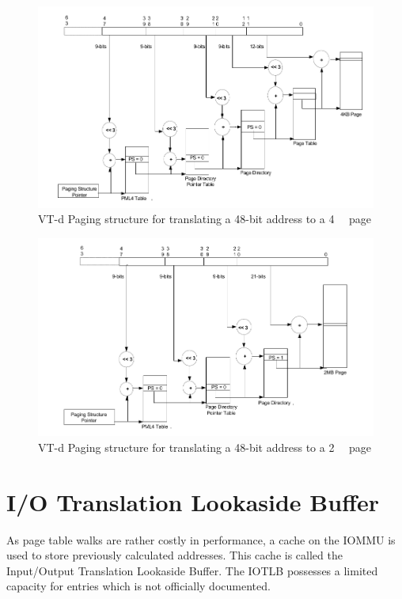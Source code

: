 \begin{figure}
    \centering
    \includegraphics[width=\textwidth]{figures/4kibtranslation.pdf}
    \caption{VT-d Paging structure for translating a 48-bit address to a \qty{4}{\kibi\byte} page}
    \label{fig:pagewalk4kib}
\end{figure}
\begin{figure}
    \centering
    \includegraphics[width=\textwidth]{figures/2mibtranslation.pdf}
    \caption{VT-d Paging structure for translating a 48-bit address to a \qty{2}{\mebi\byte} page}
    \label{fig:pagewalk2mib}
\end{figure}

\section{I/O Translation Lookaside Buffer}
As page table walks are rather costly in performance, a cache on the IOMMU is used to store previously calculated addresses. This cache is called the Input/Output Translation Lookaside Buffer. The IOTLB possesses a limited capacity for entries which is not officially documented.

